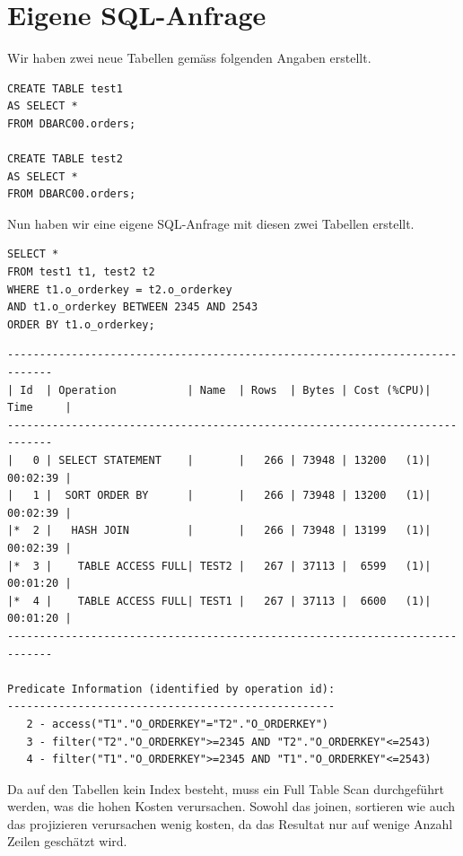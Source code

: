 \documentclass[10pt]{article}
\begin{document}
\section{Eigene SQL-Anfrage}
Wir haben zwei neue Tabellen gemäss folgenden Angaben erstellt.
\begin{lstlisting}[style=sql]
CREATE TABLE test1
AS SELECT *
FROM DBARC00.orders;

CREATE TABLE test2
AS SELECT *
FROM DBARC00.orders;
\end{lstlisting}
Nun haben wir eine eigene SQL-Anfrage mit diesen zwei Tabellen erstellt.
\begin{lstlisting}[style=sql]
SELECT *
FROM test1 t1, test2 t2
WHERE t1.o_orderkey = t2.o_orderkey
AND t1.o_orderkey BETWEEN 2345 AND 2543
ORDER BY t1.o_orderkey;
\end{lstlisting}
\begin{lstlisting}[style=queryexecutionplan]
-----------------------------------------------------------------------------
| Id  | Operation           | Name  | Rows  | Bytes | Cost (%CPU)| Time     |
-----------------------------------------------------------------------------
|   0 | SELECT STATEMENT    |       |   266 | 73948 | 13200   (1)| 00:02:39 |
|   1 |  SORT ORDER BY      |       |   266 | 73948 | 13200   (1)| 00:02:39 |
|*  2 |   HASH JOIN         |       |   266 | 73948 | 13199   (1)| 00:02:39 |
|*  3 |    TABLE ACCESS FULL| TEST2 |   267 | 37113 |  6599   (1)| 00:01:20 |
|*  4 |    TABLE ACCESS FULL| TEST1 |   267 | 37113 |  6600   (1)| 00:01:20 |
-----------------------------------------------------------------------------
 
Predicate Information (identified by operation id):
---------------------------------------------------
   2 - access("T1"."O_ORDERKEY"="T2"."O_ORDERKEY")
   3 - filter("T2"."O_ORDERKEY">=2345 AND "T2"."O_ORDERKEY"<=2543)
   4 - filter("T1"."O_ORDERKEY">=2345 AND "T1"."O_ORDERKEY"<=2543)
\end{lstlisting}
Da auf den Tabellen kein Index besteht, muss ein Full Table Scan durchgeführt werden, 
was die hohen Kosten verursachen. Sowohl das joinen, sortieren wie auch das projizieren 
verursachen wenig kosten, da das Resultat nur auf wenige Anzahl Zeilen geschätzt wird.
\end{document}
